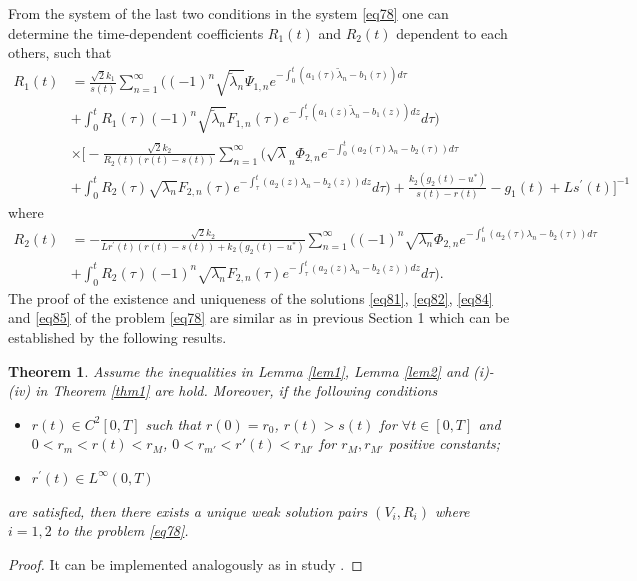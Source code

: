 \documentclass[preprint,12pt,authoryear]{elsarticle}
\newtheorem{theorem}{Theorem}
\begin{document}
From the system of the last two conditions in the system \eqref{eq78} one can determine the time-dependent coefficients $R_1(t)$ and $R_2(t)$ dependent to each others, such that
\begin{equation}\label{eq84}
    \begin{split}
        R_1(t)&=\frac{\sqrt{2}k_1}{s(t)}\sum_{n=1}^{\infty}\Bigg((-1)^n\sqrt{\widetilde{\lambda}_n}\Psi_{1,n}e^{-\int_0^t(a_1(\tau)\widetilde{\lambda}_n-b_1(\tau))d\tau}\\
        &+\int_0^t R_1(\tau)(-1)^n\sqrt{\widetilde{\lambda}_n}F_{1,n}(\tau)e^{-\int_{\tau}^t(a_1(z)\widetilde{\lambda}_n-b_1(z))dz}d\tau\Bigg)\\
        &\times\Bigg[-\frac{\sqrt{2}k_2}{R_2(t)(r(t)-s(t))}\sum_{n=1}^{\infty}\Bigg(\sqrt{\lambda}_n\Phi_{2,n}e^{-\int_0^t(a_2(\tau)\lambda_n-b_2(\tau))d\tau}\\
        &+\int_0^t R_2(\tau)\sqrt{\lambda_n}F_{2,n}(\tau)e^{-\int_{\tau}^t(a_2(z)\lambda_n-b_2(z))dz}d\tau\Bigg)+\frac{k_2(g_2(t)-u^*)}{s(t)-r(t)}-g_1(t)+Ls^{\prime}(t)\Bigg]^{-1}
    \end{split}
\end{equation}
where
\begin{equation}\label{eq85}
    \begin{split}
        R_2(t)&=-\frac{\sqrt{2}k_2}{Lr^{\prime}(t)(r(t)-s(t))+k_2(g_2(t)-u^*)}\sum\limits_{n=1}^{\infty}\Bigg((-1)^n\sqrt{\lambda_n}\Phi_{2,n}e^{-\int_0^t(a_2(\tau)\lambda_n-b_2(\tau))d\tau}\\
        &+\int_0^t R_2(\tau)(-1)^n\sqrt{\lambda_n}F_{2,n}(\tau)e^{-\int_{\tau}^t(a_2(z)\lambda_n-b_2(z))dz}d\tau\Bigg).
    \end{split}
\end{equation}
The proof of the existence and uniqueness of the solutions \eqref{eq81}, \eqref{eq82}, \eqref{eq84} and \eqref{eq85} of the problem \eqref{eq78} are similar as in previous Section 1 which can be established by the following results.
\begin{theorem}\label{thm6}
    Assume the inequalities in Lemma \ref{lem1}, Lemma \ref{lem2} and (i)-(iv) in Theorem \ref{thm1} are hold. Moreover, if the following conditions
    \begin{itemize}
        \item[(H1)] $r(t)\in C^2[0,T]$ such that $r(0)=r_0$, $r(t)>s(t)$ for $\forall t\in [0,T]$ and $0<r_m<r(t)<r_M$, $0<r_{m'}<r'(t)<r_{M'}$ for $r_M,r_{M'}$ positive constants; 
        \item[(H2)] $r^{\prime}(t)\in L^{\infty}(0,T)$
    \end{itemize}
    are satisfied, then there exists a unique weak solution pairs $(V_i, R_i)$ where $i=1,2$ to the problem \eqref{eq78}.
\end{theorem}
\begin{proof}
    It can be implemented analogously as in study \cite{20}.
\end{proof}
\end{document}
